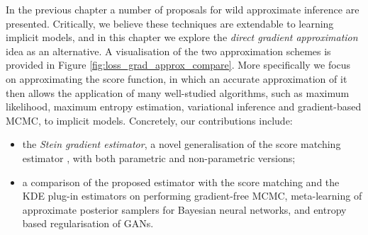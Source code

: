 
In the previous chapter a number of proposals for wild approximate inference are presented. Critically, we believe these techniques are extendable to learning implicit models, and in this chapter we explore the \emph{direct gradient approximation} idea as an alternative. A visualisation of the two approximation schemes is provided in Figure \ref{fig:loss_grad_approx_compare}. More specifically we focus on approximating the score function, in which an accurate approximation of it then allows the application of many well-studied algorithms, such as maximum likelihood, maximum entropy estimation, variational inference and gradient-based MCMC, to implicit models. Concretely, our contributions include:  
\begin{itemize}
\item the \emph{Stein gradient estimator}, a novel generalisation of the score matching estimator \citep{hyvarinen:score2005}, with both parametric and non-parametric versions;
\item a comparison of the proposed estimator with the score matching and the KDE plug-in estimators on performing gradient-free MCMC, meta-learning of approximate posterior samplers for Bayesian neural networks, and entropy based regularisation of GANs.
\end{itemize}

